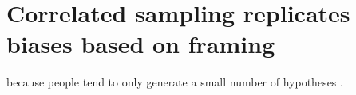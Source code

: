 



\chapter{Correlated sampling replicates biases based on framing}
\label{chap:MCMC}

because people tend to only generate a small number of hypotheses \citep{klein1999,ross96,Gettys1979,weber1993,dougherty1997}.
%
%




